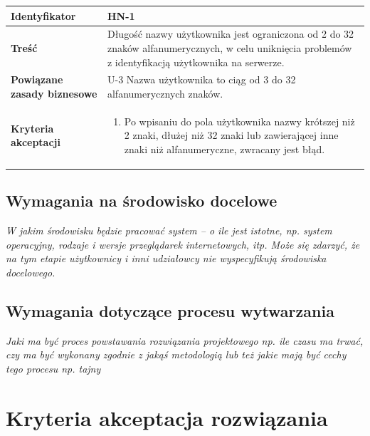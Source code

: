 \documentclass[11pt,oneside,a4paper,titlepage,onecolumn]{article}
\newenvironment{enumreq}
{ \begin{enumerate}[topsep=0pt,itemsep=-1ex,partopsep=1ex,parsep=1ex] }
{ \end{enumerate}                  }
\begin{document}
\begin{tabular}{ | l | l | }
	\hline
		\textbf{Identyfikator} & 
		HN-1
		\\
		
	\hline
		\textbf{Treść} & \parbox[t]{13cm}{
			Długość nazwy użytkownika jest ograniczona od 2 do 32 znaków alfanumerycznych, w celu uniknięcia problemów z identyfikacją użytkownika na serwerze.
		}\\
		 
	\hline
		\parbox[t]{4cm}{\textbf{Powiązane zasady biznesowe}} & \parbox[t]{13cm}{
			U-3 Nazwa użytkownika to ciąg od 3 do 32 alfanumerycznych znaków.
		}\\
		
	\hline
		\parbox[t]{4cm}{\textbf{Kryteria akceptacji}} & \parbox[t]{13cm}{
			\begin{enumreq}
				\item Po wpisaniu do pola użytkownika nazwy krótszej niż 2 znaki, dłużej niż 32 znaki lub zawierającej inne znaki niż alfanumeryczne, zwracany jest błąd.
			\end{enumreq}
			}
		\\

	\hline
\end{tabular}




\subsection{Wymagania na środowisko docelowe}

\textit{W jakim środowisku będzie pracować system – o ile jest istotne, np. system operacyjny, rodzaje i wersje przeglądarek internetowych, itp. Może się zdarzyć, że na tym etapie użytkownicy i inni udziałowcy nie wyspecyfikują środowiska docelowego.}

\subsection{Wymagania dotyczące procesu wytwarzania}

\textit{Jaki ma być proces powstawania rozwiązania projektowego np. ile czasu ma trwać, czy ma być wykonany zgodnie z jakąś metodologią lub też jakie mają być cechy tego procesu np. tajny}

\section{Kryteria akceptacja rozwiązania}
\end{document}

